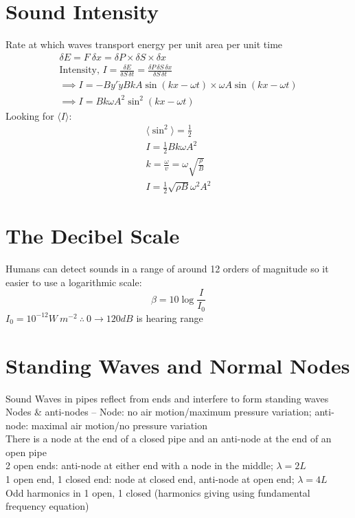 \documentclass[a4paper, 11pt, fleqn, normalem]{report}
\begin{document}
\section{Sound Intensity}
Rate at which waves transport energy per unit area per unit time
\begin{gather*}
    \delta E = F\:\delta x = \delta P\times \delta S\times \delta x \\
    \text{Intensity, } I = \frac{\delta E}{\delta S\,\delta t} = \frac{\delta P\,\delta S\,\delta x}{\delta S\,\delta t} \\
    \implies I = -By'\dot{y} BkA\sin{(kx - \omega t)}\times\omega A\sin{(kx - \omega t)} \\
    \implies I = Bk\omega A^{2}\sin^{2}{(kx - \omega t)}
\end{gather*}
Looking for $\langle I\rangle$:
\begin{gather*}
    \langle\sin^{2}\rangle = \frac{1}{2} \\
    I = \frac{1}{2}Bk\omega A^{2} \\
    k = \frac{\omega}{v} = \omega\sqrt{\frac{\rho}{B}} \\
    I = \frac{1}{2}\sqrt{\rho B}\omega^{2}A^{2}
\end{gather*}

\section{The Decibel Scale}
Humans can detect sounds in a range of around 12 orders of magnitude so it easier to use a logarithmic scale:
\begin{equation*}
    \beta = 10\log{\frac{I}{I_{0}}}
\end{equation*}
$I_{0} = 10^{-12} W\:m^{-2} ~\therefore~ 0 \rightarrow 120dB$ is hearing range

\section{Standing Waves and Normal Nodes}
Sound Waves in pipes reflect from ends and interfere to form standing waves \\
Nodes \& anti-nodes --
Node: no air motion/maximum pressure variation; anti-node: maximal air motion/no pressure variation \\
There is a node at the end of a closed pipe and an anti-node at the end of an open pipe \\
2 open ends: anti-node at either end with a node in the middle; $\lambda = 2L$ \\
1 open end, 1 closed end: node at closed end, anti-node at open end; $\lambda = 4L$ \\
Odd harmonics in 1 open, 1 closed (harmonics giving using fundamental frequency equation)
\end{document}
